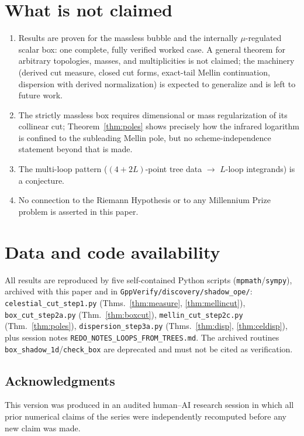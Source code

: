 \documentclass[12pt,a4paper]{article}
\theoremstyle{plain}
\theoremstyle{definition}
\theoremstyle{remark}
\begin{document}
\section{What is not claimed}
\label{sec:notclaimed}
\begin{enumerate}
\item Results are proven for the massless bubble and the internally
$\mu$-regulated scalar box: one complete, fully verified worked case.
A general theorem for arbitrary topologies, masses, and multiplicities
is not claimed; the machinery (derived cut measure, closed
cut forms, exact-tail Mellin continuation, dispersion with derived
normalization) is expected to generalize and is left to future work.
\item The strictly massless box requires dimensional or mass
regularization of its collinear cut; Theorem~\ref{thm:poles} shows
precisely how the infrared logarithm is confined to the subleading
Mellin pole, but no scheme-independence statement beyond that is made.
\item The multi-loop pattern ($(4+2L)$-point tree data $\to$ $L$-loop
integrands) is a conjecture.
\item No connection to the Riemann Hypothesis or to any Millennium
Prize problem is asserted in this paper.
\end{enumerate}

\section{Data and code availability}
\label{sec:code}
All results are reproduced by five self-contained Python scripts
(\texttt{mpmath}/\texttt{sympy}), archived with this paper and in
\texttt{GppVerify/discovery/shadow\_ope/}:
\texttt{celestial\_cut\_step1.py} (Thms.~\ref{thm:measure},
\ref{thm:mellincut}),
\texttt{box\_cut\_step2a.py} (Thm.~\ref{thm:boxcut}),
\texttt{mellin\_cut\_step2c.py} (Thm.~\ref{thm:poles}),
\texttt{dispersion\_step3a.py} (Thms.~\ref{thm:disp},
\ref{thm:celdisp}),
plus session notes \texttt{REDO\_NOTES\_LOOPS\_FROM\_TREES.md}.
The archived routines \texttt{box\_shadow\_1d}/\texttt{check\_box} are
deprecated and must not be cited as verification.

\subsection*{Acknowledgments}
This version was produced in an audited human--AI research session in
which all prior numerical claims of the series were independently
recomputed before any new claim was made.
\end{document}
